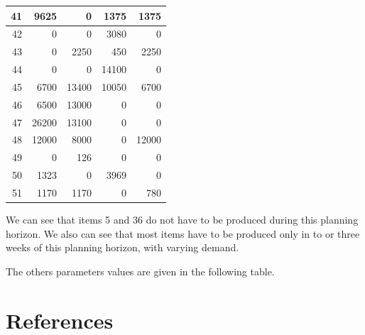\documentclass[preprint, 3p,
authoryear]{elsarticle} %
\begin{document}
\begin{table}[!h]
\begin{tabular}[t]{r|r|r|r|r}
\hline
41 & 9625 & 0 & 1375 & 1375\\
\hline
42 & 0 & 0 & 3080 & 0\\
\hline
43 & 0 & 2250 & 450 & 2250\\
\hline
44 & 0 & 0 & 14100 & 0\\
\hline
45 & 6700 & 13400 & 10050 & 6700\\
\hline
46 & 6500 & 13000 & 0 & 0\\
\hline
47 & 26200 & 13100 & 0 & 0\\
\hline
48 & 12000 & 8000 & 0 & 12000\\
\hline
49 & 0 & 126 & 0 & 0\\
\hline
50 & 1323 & 0 & 3969 & 0\\
\hline
51 & 1170 & 1170 & 0 & 780\\
\hline
\end{tabular}
\end{table}

We can see that items 5 and 36 do not have to be produced during this
planning horizon. We also can see that most items have to be produced
only in to or three weeks of this planning horizon, with varying demand.

The others parameters values are given in the following table.

\newpage

\hypertarget{references}{%
\section*{References}\label{references}}
\end{document}
